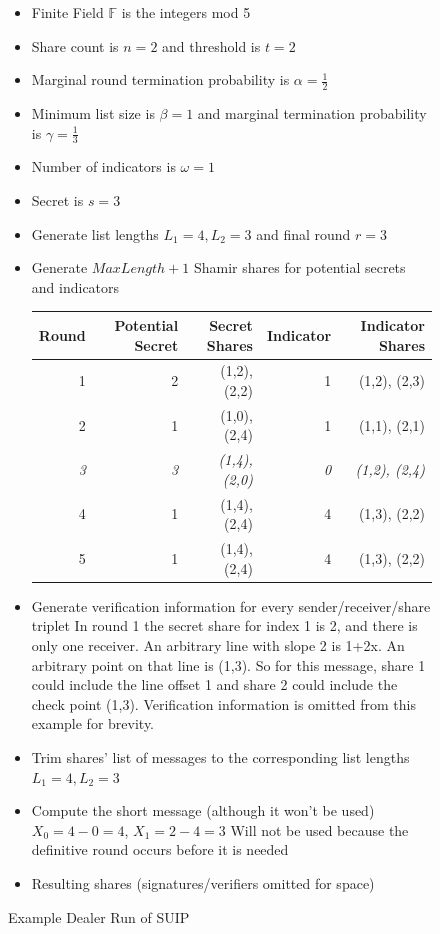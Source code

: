 \documentclass[12pt]{dalcsthesis}
\begin{document}
\begin{figure}
  \caption{Example Dealer Run of SUIP}
  \label{Ex:SUIP}
  \begin{itemize}
    \item Finite Field $\mathbb{F}$ is the integers mod 5
    \item Share count is $n = 2$ and threshold is $t = 2$
    \item Marginal round termination probability is $\alpha = \frac{1}{2}$
    \item Minimum list size is $\beta = 1$ and marginal termination probability is $\gamma = \frac{1}{3}$
    \item Number of indicators is $\omega = 1$
    \item Secret is $s = 3$
    \item Generate list lengths $L_1 = 4, L_2 = 3$ and final round $r = 3$
    \item Generate $MaxLength+1$ Shamir shares for potential secrets and indicators
  
      \begin{tabular}{|r|r|r|r|r|}
      \hline
        Round & Potential Secret & Secret Shares & Indicator & Indicator Shares \\
      \hline
        1 & 2  & (1,2), (2,2) & 1 & (1,2), (2,3) \\
      \hline
        2 & 1  & (1,0), (2,4) & 1 & (1,1), (2,1) \\
      \hline
        \emph{3} & \emph{3}  & \emph{(1,4), (2,0)} & \emph{0} & \emph{(1,2), (2,4)} \\
      \hline
        4 & 1  & (1,4), (2,4) & 4 & (1,3), (2,2) \\
      \hline
        5 & 1  & (1,4), (2,4) & 4 & (1,3), (2,2) \\
      \hline
      \end{tabular}
      
    \item Generate verification information for every sender/receiver/share triplet
    \subitem In round 1 the secret share for index 1 is 2, and there is only one receiver. An arbitrary line with slope 2 is 1+2x. An arbitrary point on that line is (1,3). So for this message, share 1 could include the line offset 1 and share 2 could include the check point (1,3).
    \subitem Verification information is omitted from this example for brevity.
    
    \item Trim shares' list of messages to the corresponding list lengths $L_1 = 4, L_2 = 3$
    \item Compute the short message (although it won't be used)
    \subitem $X_0 = 4 - 0 = 4$, $X_1 = 2 - 4 = 3$
    \subitem Will not be used because the definitive round occurs before it is needed
    \item Resulting shares (signatures/verifiers omitted for space)
    

\end{itemize}
\end{figure}
\end{document}
